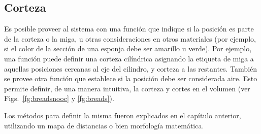\subsection{Corteza}
Es posible proveer al sistema con una función que indique si la posición es parte de la corteza o la miga, u otras consideraciones en otros materiales (por ejemplo, si el color de la sección de una esponja debe ser amarillo u verde).
Por ejemplo, una función puede definir una corteza cilíndrica asignando la etiqueta de miga a aquellas posiciones cercanas al eje del cilindro, y corteza a las restantes.
También se provee otra función que establece si la posición debe ser considerada aire.
Esto permite definir, de una manera intuitiva, la corteza y cortes en el volumen (ver Figs.~\ref{fg:breadsnooc} y \ref{fg:breads}).

Los métodos para definir la misma fueron explicados en el capítulo anterior, utilizando un mapa de distancias o bien morfología matemática.






